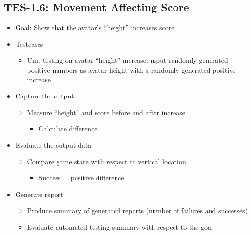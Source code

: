\subsection{TES-1.6: Movement Affecting Score}
\begin{itemize}
\item Goal: Show that the avatar’s \textquotedblleft{}height\textquotedblright{} increases score

\item Testcases
\begin{itemize}
\item Unit testing on avatar “height” increase: input randomly generated positive numbers as avatar height with a randomly generated positive increase
\end{itemize}

\item Capture the output
\begin{itemize}
\item Measure “height” and score before and after increase
\begin{itemize}
\item Calculate difference
\end{itemize}
\end{itemize}

\item Evaluate the output data
\begin{itemize}
\item Compare game state with respect to vertical location
\begin{itemize}
\item Success = positive difference
\end{itemize}
\end{itemize}

\item Generate report
\begin{itemize}
\item Produce summary of generated reports (number of failures and successes)
\item Evaluate automated testing summary with respect to the goal
\end{itemize}
\end{itemize}


